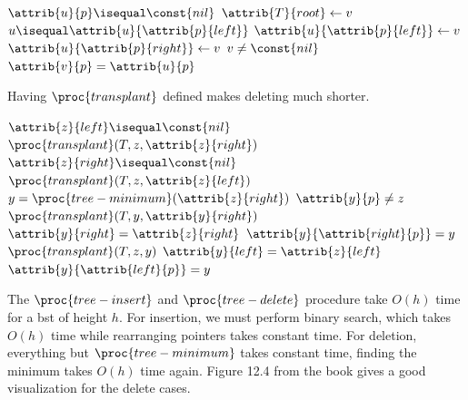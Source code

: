 \documentclass[12pt]{article}
\begin{document}
\begin{codebox}
\li \If $\attrib{u}{p} \isequal \const{nil}$
\li \Then
        $\attrib{T}{root} \gets{v}$
\li \ElseIf $u \isequal \attrib{u}{\attrib{p}{left}}$
\li \Then
        $\attrib{u}{\attrib{p}{left}} \gets{v}$
\li \Else
\li     $\attrib{u}{\attrib{p}{right}} \gets{v}$
    \End
\li \If $v \neq \const{nil}$
\li \Then
        $\attrib{v}{p} = \attrib{u}{p}$
    \End
\end{codebox}

Having $\proc{transplant}$ defined makes deleting much shorter.
\begin{codebox}
\li \If $\attrib{z}{left} \isequal \const{nil}$
\li \Then
        $\proc{transplant}(T, z, \attrib{z}{right})$
\li \ElseIf $\attrib{z}{right} \isequal \const{nil}$
\li \Then
        $\proc{transplant}(T, z, \attrib{z}{left})$
\li \Else
\li     $y = \proc{tree-minimum}(\attrib{z}{right})$
\li     \If $\attrib{y}{p} \neq z$
\li     \Then
            $\proc{transplant}(T, y, \attrib{y}{right})$
\li         $\attrib{y}{right} = \attrib{z}{right}$
\li         $\attrib{y}{\attrib{right}{p}} = y$
        \End
\li     $\proc{transplant}(T, z, y)$
\li     $\attrib{y}{left} = \attrib{z}{left}$
\li     $\attrib{y}{\attrib{left}{p}} = y$
    \End
\end{codebox}

The $\proc{tree-insert}$ and $\proc{tree-delete}$ procedure take $O(h)$ time for a bst of height $h$. For insertion, we must perform binary search, which takes $O(h)$ time while rearranging pointers takes constant time. For deletion, everything but $\proc{tree-minimum}$ takes constant time, finding the minimum takes $O(h)$ time again. Figure 12.4 from the book gives a good visualization for the delete cases.

\newpage
\end{document}
